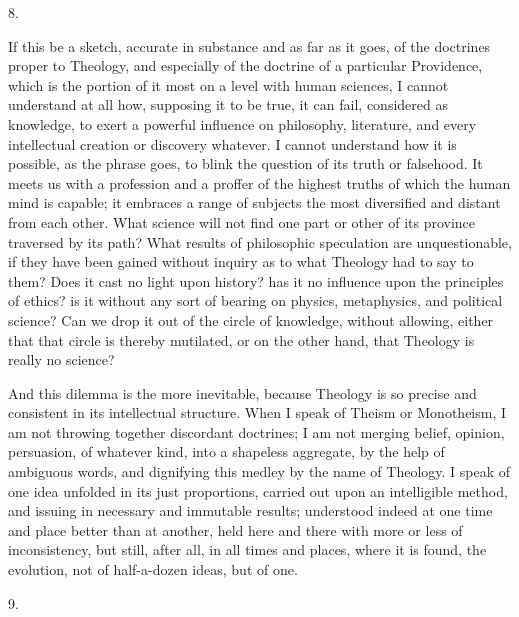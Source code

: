 8.

If this be a sketch, accurate in substance and as far as it goes,
of the doctrines proper to Theology, and especially of the doctrine of
a particular Providence, which is the portion of it most on a level
with human sciences, I cannot understand at all how, supposing it to
be true, it can fail, considered as knowledge, to exert a powerful
influence on philosophy, literature, and every intellectual creation
or discovery whatever. I cannot understand how it is possible, as the
phrase goes, to blink the question of its truth or falsehood. It meets
us with a profession and a proffer of the highest truths of which the
human mind is capable; it embraces a range of subjects the most
diversified and distant from each other. What science will not find
one part or other of its province traversed by its path? What results
of philosophic speculation are unquestionable, if they have been
gained without inquiry as to what Theology had to say to them? Does it
cast no light upon history? has it no influence upon the
principles of ethics? is it without any sort of bearing on physics,
metaphysics, and political science? Can we drop it out of the circle
of knowledge, without allowing, either that that circle is thereby
mutilated, or on the other hand, that Theology is really no science?

And this dilemma is the more inevitable, because Theology is so
precise and consistent in its intellectual structure. When I speak of
Theism or Monotheism, I am not throwing together discordant doctrines;
I am not merging belief, opinion, persuasion, of whatever kind, into a
shapeless aggregate, by the help of ambiguous words, and dignifying
this medley by the name of Theology. I speak of one idea unfolded in
its just proportions, carried out upon an intelligible method, and
issuing in necessary and immutable results; understood indeed at one
time and place better than at another, held here and there with more
or less of inconsistency, but still, after all, in all times and
places, where it is found, the evolution, not of half-a-dozen ideas,
but of one.

9.

